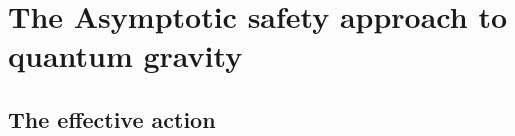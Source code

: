 \documentclass[11pt, a4paper]{article}
\begin{document}



\section{The Asymptotic safety approach to quantum gravity}
\subsection{The effective action}
\end{document}
